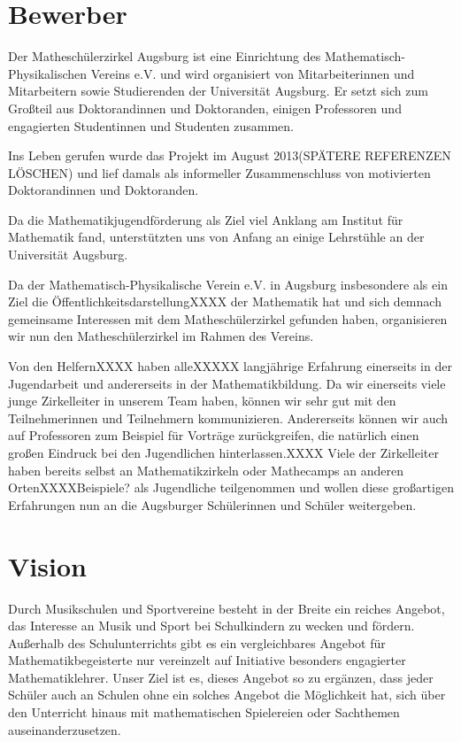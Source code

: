 \documentclass[12pt]{zettel}
\begin{document}
\section{Bewerber}

Der Matheschülerzirkel Augsburg ist eine Einrichtung des
Mathematisch-Physikalischen Vereins e.V. und wird organisiert von
Mitarbeiterinnen und Mitarbeitern sowie Studierenden der Universität
Augsburg. Er setzt sich zum Großteil aus Doktorandinnen und Doktoranden,
einigen Professoren und engagierten Studentinnen und Studenten zusammen.

Ins Leben gerufen wurde das Projekt im August 2013(SPÄTERE REFERENZEN
LÖSCHEN) und lief damals als informeller Zusammenschluss von motivierten
Doktorandinnen und Doktoranden.

Da die Mathematikjugendförderung als Ziel viel Anklang am
Institut für Mathematik fand, unterstützten uns von Anfang an einige
Lehrstühle an der Universität Augsburg.

Da der Mathematisch-Physikalische Verein e.V. in Augsburg insbesondere
als ein Ziel die ÖffentlichkeitsdarstellungXXXX der Mathematik hat und
sich demnach gemeinsame Interessen mit dem Matheschülerzirkel gefunden
haben, organisieren wir nun den Matheschülerzirkel im Rahmen des Vereins.

Von den HelfernXXXX haben alleXXXXX langjährige Erfahrung einerseits in
der Jugendarbeit und andererseits in der Mathematikbildung. Da wir
einerseits viele junge Zirkelleiter in unserem Team haben, können wir
sehr gut mit den Teilnehmerinnen und Teilnehmern kommunizieren.
Andererseits können wir auch auf Professoren zum Beispiel für Vorträge
zurückgreifen, die natürlich einen großen Eindruck bei den Jugendlichen
hinterlassen.XXXX Viele der Zirkelleiter haben bereits selbst an
Mathematikzirkeln oder Mathecamps an anderen OrtenXXXXBeispiele? als
Jugendliche teilgenommen und wollen diese großartigen Erfahrungen nun an
die Augsburger Schülerinnen und Schüler weitergeben.


\section{Vision}

Durch Musikschulen und Sportvereine besteht in der Breite ein reiches
Angebot, das Interesse an Musik und Sport bei Schulkindern zu wecken und
fördern. Außerhalb des Schulunterrichts gibt es ein vergleichbares
Angebot für Mathematikbegeisterte nur vereinzelt auf
Initiative besonders engagierter Mathematiklehrer. Unser Ziel ist es,
dieses Angebot so zu ergänzen, dass jeder Schüler auch an Schulen ohne
ein solches Angebot die Möglichkeit hat, sich über den Unterricht
hinaus mit mathematischen Spielereien oder Sachthemen
auseinanderzusetzen.
\end{document}
